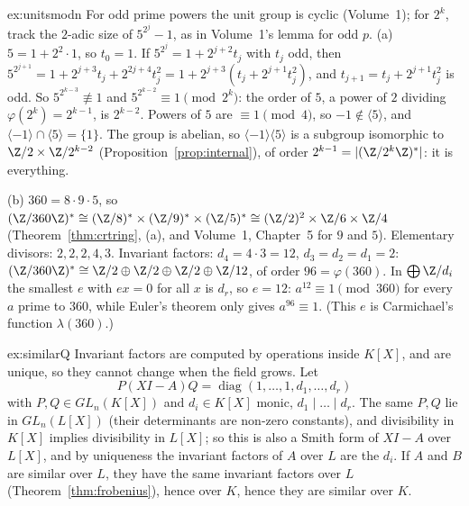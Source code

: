 \begin{solution}{ex:unitsmodn}
\idea For odd prime powers the unit group is cyclic (Volume~1); for $2^k$, track the $2$-adic size of $5^{2^j}-1$, as in Volume~1's lemma for odd $p$.
\writeup (a) $5=1+2^2\cdot1$, so $t_0=1$. If $5^{2^j}=1+2^{j+2}t_j$ with $t_j$ odd, then $5^{2^{j+1}}=1+2^{j+3}t_j+2^{2j+4}t_j^2=1+2^{j+3}(t_j+2^{j+1}t_j^2)$, and $t_{j+1}=t_j+2^{j+1}t_j^2$ is odd. So $5^{2^{k-3}}\not\equiv1$ and $5^{2^{k-2}}\equiv1\pmod{2^k}$: the order of $5$, a power of $2$ dividing $\varphi(2^k)=2^{k-1}$, is $2^{k-2}$. Powers of $5$ are $\equiv1\pmod4$, so $-1\notin\langle5\rangle$, and $\langle-1\rangle\cap\langle5\rangle=\{1\}$. The group is abelian, so $\langle-1\rangle\langle5\rangle$ is a subgroup isomorphic to $\Z/2\times\Z/2^{k-2}$ (Proposition~\ref{prop:internal}), of order $2^{k-1}=|(\Z/2^k\Z)^*|$: it is everything.

(b) $360=8\cdot9\cdot5$, so $(\Z/360\Z)^*\cong(\Z/8)^*\times(\Z/9)^*\times(\Z/5)^*\cong(\Z/2)^2\times\Z/6\times\Z/4$ (Theorem~\ref{thm:crtring}, (a), and Volume~1, Chapter~5 for $9$ and $5$). Elementary divisors: $2,2,2,4,3$. Invariant factors: $d_4=4\cdot3=12$, $d_3=d_2=d_1=2$: $(\Z/360\Z)^*\cong\Z/2\oplus\Z/2\oplus\Z/2\oplus\Z/12$, of order $96=\varphi(360)$. In $\bigoplus\Z/d_i$ the smallest $e$ with $ex=0$ for all $x$ is $d_r$, so $e=12$: $a^{12}\equiv1\pmod{360}$ for every $a$ prime to $360$, while Euler's theorem only gives $a^{96}\equiv1$. (This $e$ is Carmichael's function $\lambda(360)$.)
\end{solution}

\begin{solution}{ex:similarQ}
\idea Invariant factors are computed by operations inside $K[X]$, and are unique, so they cannot change when the field grows.
\writeup Let
\[
P(XI-A)Q=\operatorname{diag}(1,\dots,1,d_1,\dots,d_r)
\]
with $P,Q\in GL_n(K[X])$ and $d_i\in K[X]$ monic, $d_1\mid\dots\mid d_r$. The same $P,Q$ lie in $GL_n(L[X])$ (their determinants are non-zero constants), and divisibility in $K[X]$ implies divisibility in $L[X]$; so this is also a Smith form of $XI-A$ over $L[X]$, and by uniqueness the invariant factors of $A$ over $L$ are the $d_i$. If $A$ and $B$ are similar over $L$, they have the same invariant factors over $L$ (Theorem~\ref{thm:frobenius}), hence over $K$, hence they are similar over $K$.
\end{solution}

